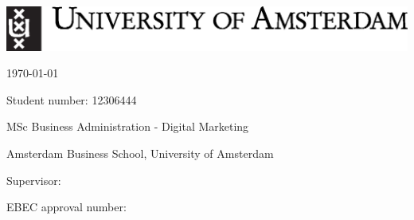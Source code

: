 \makeatletter
\begin{titlepage}
  \begin{center}
    \includegraphics[scale=0.5]{images/uva_logo.eps}

    \vspace{0.8cm}

    \huge{\textbf{\@title}} 

    \vspace{0.8cm}

    \large{\@author}

    \normalsize{\today}

  \end{center}

  \vfill


  \normalsize

  Student number: 12306444

  MSc Business Administration - Digital Marketing

  Amsterdam Business School, University of Amsterdam

  Supervisor: 

  EBEC approval number: 

\end{titlepage}
\makeatother

